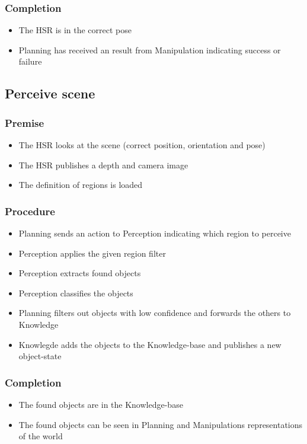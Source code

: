 \documentclass[main.tex]{subfiles}
\begin{document}
	\subsubsection{Completion}
	\begin{itemize}
		\item The HSR is in the correct pose
		\item Planning has received an result from Manipulation indicating success or failure		
	\end{itemize}
	
	\subsection{Perceive scene} 
	
	\subsubsection{Premise}
	\begin{itemize}
		\item The HSR looks at the scene (correct position, orientation and pose)
		\item The HSR publishes a depth and camera image
		\item The definition of regions is loaded 
	\end{itemize} 
	
	\subsubsection{Procedure}
	\begin{itemize}			
		\item Planning sends an action to Perception indicating which region to perceive
		\item Perception applies the given region filter
		\item Perception extracts found objects
		\item Perception classifies the objects	
		\item Planning filters out objects with low confidence and forwards the others to Knowledge
		\item Knowlegde adds the objects to the Knowledge-base and publishes a new object-state			
	\end{itemize}
	
	\subsubsection{Completion}
	\begin{itemize}
		\item The found objects are in the Knowledge-base
		\item The found objects can be seen in Planning and Manipulations representations of the world 		
	\end{itemize}
	
\end{document}
